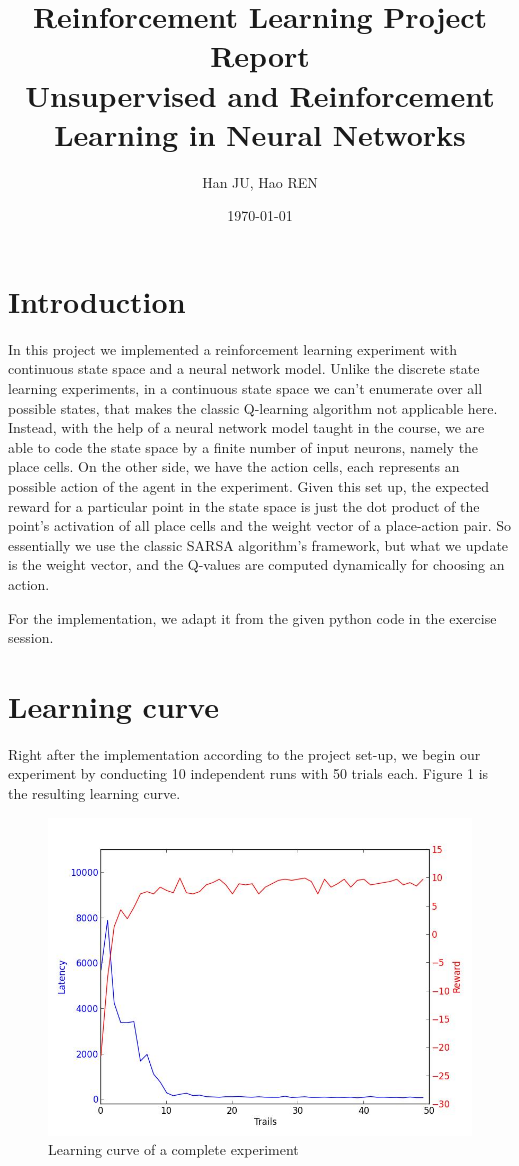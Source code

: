 \documentclass[a4paper, 11pt]{article}
\title{Reinforcement Learning Project Report \\ \vspace{0.5cm} \large Unsupervised and Reinforcement Learning in Neural Networks}
\author{Han JU, Hao REN}
\date{\today}
\begin{document}
\maketitle
\section{Introduction}

In this project we implemented a reinforcement learning experiment with
continuous state space and a neural network model. Unlike the discrete
state learning experiments, in a continuous state space we can't
enumerate over all possible states, that makes the classic Q-learning
algorithm not applicable here. Instead, with the help of a neural
network model taught in the course, we are able to code the state
space by a finite number of input neurons, namely the place cells. On
the other side, we have the action cells, each represents an possible
action of the agent in the experiment. Given this set up, the expected
reward for a particular point in the state space is just the dot
product of the point's activation of all place cells and the weight
vector of a place-action pair. So essentially we
use the classic SARSA algorithm's framework, but what we update is the
weight vector, and the Q-values are computed dynamically for choosing
an action.

For the implementation, we adapt it from the given python code in the
exercise session.

\section{Learning curve}

Right after the implementation according to the project set-up, we
begin our experiment by conducting 10 independent runs with 50 trials
each. Figure 1 is the resulting learning curve.

\begin{figure}[h]
\centering
\includegraphics[scale=0.4]{../figure/learning_curve.jpg}
\caption{Learning curve of a complete experiment}
\end{figure}
\end{document}
